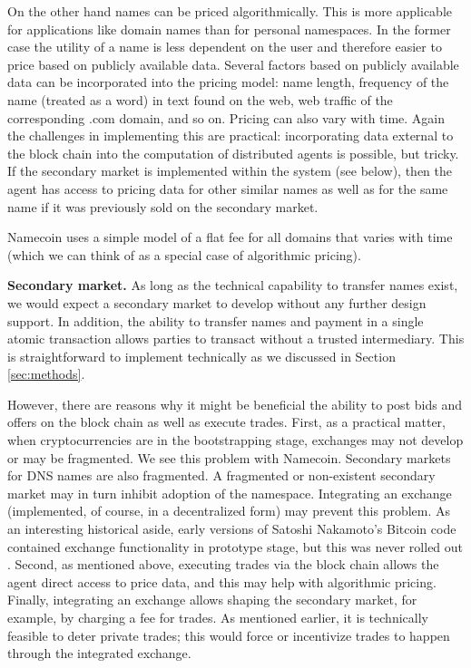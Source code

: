 On the other hand names can be priced algorithmically. This is more applicable for applications like domain names than for personal namespaces. In the former case the utility of a name is less dependent on the user and therefore easier to price based on publicly available data. Several factors based on publicly available data can be incorporated into the pricing model: name length, frequency of the name (treated as a word) in text found on the web, web traffic of the corresponding .com domain, and so on. Pricing can also vary with time. Again the challenges in implementing this are practical: incorporating data external to the block chain into the computation of distributed agents is possible, but tricky. If the secondary market is implemented within the system (see below), then the agent has access to pricing data for other similar names as well as for the same name if it was previously sold on the secondary market.


Namecoin uses a simple model of a flat fee for all domains that varies with time (which we can think of as a special case of algorithmic pricing).

{\bf Secondary market.} As long as the technical capability to transfer names exist, we would expect a secondary market to develop without any further design support. In addition, the ability to transfer names and payment in a single atomic transaction allows parties to transact without a trusted intermediary. This is straightforward to implement technically as we discussed in Section \ref{sec:methods}. 

However, there are reasons why it might be beneficial the ability to post bids and offers on the block chain as well as execute trades. First, as a practical matter, when cryptocurrencies are in the bootstrapping stage, exchanges may not develop or may be fragmented. We see this problem with Namecoin. Secondary markets for DNS names are also fragmented. A fragmented or non-existent secondary market may in turn inhibit adoption of the namespace. Integrating an exchange (implemented, of course, in a decentralized form) may prevent this problem. As an interesting historical aside, early versions of Satoshi Nakamoto's Bitcoin code contained exchange functionality in prototype stage, but this was never rolled out \cite{}.  Second, as mentioned above, executing trades via the block chain allows the agent direct access to price data, and this may help with algorithmic pricing. Finally, integrating an exchange allows shaping  the secondary market, for example, by charging a fee for trades. As mentioned earlier, it is technically feasible to deter private trades; this would force or incentivize trades to happen through the integrated exchange.


